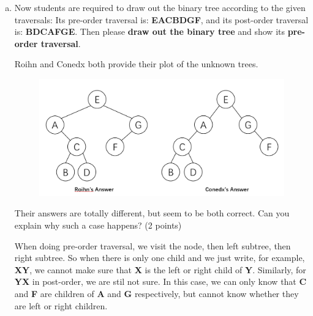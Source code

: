 \documentclass[11pt]{exam}
\begin{document}
\begin{enumerate}[a)]
\item Now students are required to draw out the binary tree according to the given traversals: Its pre-order traversal is: \textbf{EACBDGF}, and its post-order traversal is: \textbf{BDCAFGE}. Then please \textbf{draw out the binary tree} and show its \textbf{pre-order traversal}.

Roihn and Conedx both provide their plot of the unknown trees. 
\begin{figure}[H]
\centering
\includegraphics[width=.8\linewidth]{two_ans.png}
\end{figure}

Their answers are totally different, but seem to be both correct. Can you explain why such a case happens? (2 points)

\begin{solution}
\par
When doing pre-order traversal, we visit the node, then left subtree, then right subtree. So when there is only one child and we just write, for example, \textbf{XY}, we cannot make sure that \textbf{X} is the left or right child of \textbf{Y}. Similarly, for \textbf{YX} in post-order, we are stil not sure. In this case, we can only know that \textbf{C} and \textbf{F} are children of \textbf{A} and \textbf{G} respectively, but cannot know whether they are left or right children.
\end{solution}

\end{enumerate}
\end{document}
